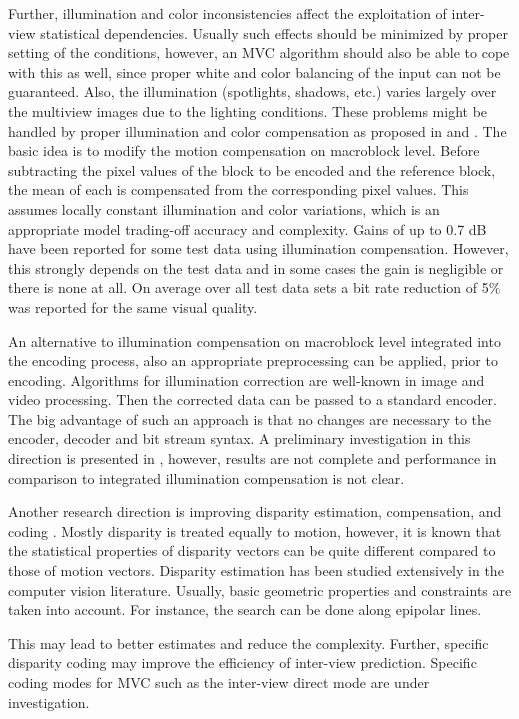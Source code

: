 Further, illumination and color inconsistencies affect the exploitation of inter-view statistical dependencies. Usually such effects should be minimized by proper setting of the conditions, however, an MVC algorithm should also be able to cope with this as well, since proper white and color balancing of the input can not be guaranteed. Also, the illumination (spotlights, shadows, etc.) varies largely over the multiview images due to the lighting conditions. These problems might be handled by proper illumination and color compensation as proposed in  and . The basic idea is to modify the motion compensation on macroblock level. Before subtracting the pixel values of the block to be encoded and the reference block, the mean of each is compensated from the corresponding pixel values. This assumes locally constant illumination and color variations, which is an appropriate model trading-off accuracy and complexity. Gains of up to 0.7 dB have been reported for some test data using illumination compensation. However, this strongly depends on the test data and in some cases the gain is negligible or there is none at all. On average over all test data sets a bit rate reduction of 5\% was reported for the same visual quality.

An alternative to illumination compensation on macroblock level integrated into the encoding process, also an appropriate preprocessing can be applied, prior to encoding. Algorithms for illumination correction are well-known in image and video processing. Then the corrected data can be passed to a standard encoder. The big advantage of such an approach is that no changes are necessary to the encoder, decoder and bit stream syntax. A preliminary investigation in this direction is presented in , however, results are not complete and performance in comparison to integrated illumination compensation is not clear.

Another research direction is improving disparity estimation, compensation, and coding . Mostly disparity is treated equally to motion, however, it is known that the statistical properties of disparity vectors can be quite different compared to those of motion vectors. Disparity estimation has been studied extensively in the computer vision literature. Usually, basic geometric properties and constraints are taken into account. For instance, the search can be done along epipolar lines.

This may lead to better estimates and reduce the complexity. Further, specific disparity coding may improve the efficiency of inter-view prediction. Specific coding modes for MVC such as the inter-view direct mode  are under investigation.

